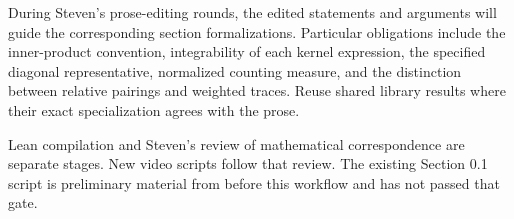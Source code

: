 During Steven's prose-editing rounds, the edited statements and arguments will guide the corresponding section formalizations. Particular obligations include the inner-product convention, integrability of each kernel expression, the specified diagonal representative, normalized counting measure, and the distinction between relative pairings and weighted traces. Reuse shared library results where their exact specialization agrees with the prose.

Lean compilation and Steven's review of mathematical correspondence are separate stages. New video scripts follow that review. The existing Section 0.1 script is preliminary material from before this workflow and has not passed that gate.
